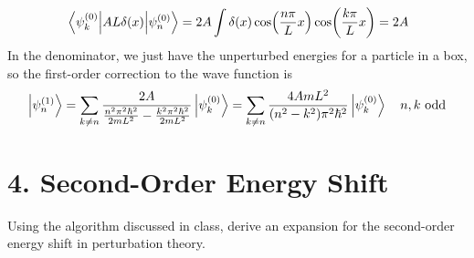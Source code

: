 \documentclass[a4paper,twoside]{article}
\begin{document}
\begin{problem}
\begin{equation}
        \mel{\psi_k^{(0)}}{AL \delta(x)}{\psi_n^{(0)}} = 2A \int \delta(x) \cos(\frac{n \pi}{L} x) \cos(\frac{k \pi}{L} x) = 2A
    \end{equation}
    In the denominator, we just have the unperturbed energies for a particle in a box, so the first-order correction to the wave function is
    \begin{equation}
        \ket{\psi_n^{(1)}} = \sum_{k \neq n} \frac{2A}{\frac{n^2 \pi^2 \hbar^2}{2mL^2} - \frac{k^2 \pi^2 \hbar^2}{2mL^2}}\ket{\psi_k^{(0)}} = \sum_{k \neq n} \frac{4AmL^2}{(n^2 - k^2) \pi^2 \hbar^2}\ket{\psi_k^{(0)}} \quad n,k \text{ odd}
    \end{equation}
\end{problem}

\section*{4. Second-Order Energy Shift}
Using the algorithm discussed in class, derive an expansion for the second-order energy shift in perturbation theory.
\end{document}
